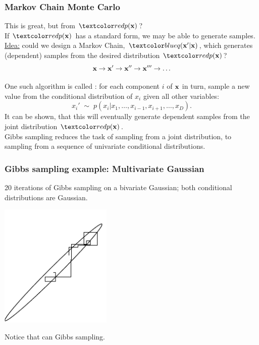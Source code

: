 \begin{frame}
\frametitle{Markov Chain Monte Carlo}

This is great, but  from
$\Red{p(\bfx)}$?\\[1ex]

If $\Red{p(\bfx)}$ has a standard form, we may be
able to generate  samples.\\[1ex]

\underline{Idea:} could we design a Markov Chain,
$\Blue{q(\bfx'|\bfx)}$, which generates (dependent) samples from the
desired distribution $\Red{p(\bfx)}$?
\[
\mathbf x \rightarrow \mathbf x' \rightarrow \mathbf x'' \rightarrow  \mathbf x'''
\rightarrow \ldots
\]


One such algorithm is called : for each
component $i$ of $\mathbf x$ in turn, sample a new value from the
conditional distribution of $x_i$ given all other variables:
\[
x_i'\;\sim\;p(x_i|x_1,\ldots,x_{i-1},x_{i+1},\ldots,x_D).
\]
It can be shown, that this will eventually generate dependent samples from the 
joint distribution $\Red{p(\bfx)}$.\\[1ex]

Gibbs sampling reduces the task of sampling from a joint distribution,
to sampling from a sequence of univariate conditional distributions.
\end{frame}


\begin{frame}
\frametitle{Gibbs sampling example: Multivariate Gaussian}

20 iterations of Gibbs sampling on a bivariate Gaussian; both
conditional distributions are Gaussian.

\begin{center}
\includegraphics[width=0.4\textwidth]{bvg-gibbs}
\end{center}

Notice that  can  Gibbs sampling.
\end{frame}


